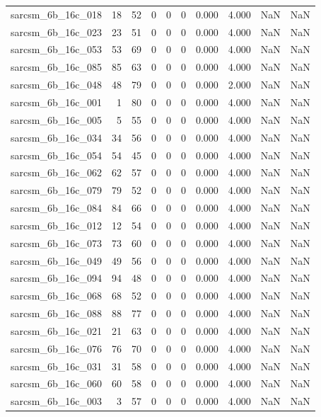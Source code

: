 \documentclass{article}
\begin{document}
\begin{longtable}{lrrrrrrrrr}
sarcsm\_6b\_16c\_018 & 18 & 52 & 0 & 0 & 0 & 0.000 & 4.000 & NaN & NaN \\
sarcsm\_6b\_16c\_023 & 23 & 51 & 0 & 0 & 0 & 0.000 & 4.000 & NaN & NaN \\
sarcsm\_6b\_16c\_053 & 53 & 69 & 0 & 0 & 0 & 0.000 & 4.000 & NaN & NaN \\
sarcsm\_6b\_16c\_085 & 85 & 63 & 0 & 0 & 0 & 0.000 & 4.000 & NaN & NaN \\
sarcsm\_6b\_16c\_048 & 48 & 79 & 0 & 0 & 0 & 0.000 & 2.000 & NaN & NaN \\
sarcsm\_6b\_16c\_001 & 1 & 80 & 0 & 0 & 0 & 0.000 & 4.000 & NaN & NaN \\
sarcsm\_6b\_16c\_005 & 5 & 55 & 0 & 0 & 0 & 0.000 & 4.000 & NaN & NaN \\
sarcsm\_6b\_16c\_034 & 34 & 56 & 0 & 0 & 0 & 0.000 & 4.000 & NaN & NaN \\
sarcsm\_6b\_16c\_054 & 54 & 45 & 0 & 0 & 0 & 0.000 & 4.000 & NaN & NaN \\
sarcsm\_6b\_16c\_062 & 62 & 57 & 0 & 0 & 0 & 0.000 & 4.000 & NaN & NaN \\
sarcsm\_6b\_16c\_079 & 79 & 52 & 0 & 0 & 0 & 0.000 & 4.000 & NaN & NaN \\
sarcsm\_6b\_16c\_084 & 84 & 66 & 0 & 0 & 0 & 0.000 & 4.000 & NaN & NaN \\
sarcsm\_6b\_16c\_012 & 12 & 54 & 0 & 0 & 0 & 0.000 & 4.000 & NaN & NaN \\
sarcsm\_6b\_16c\_073 & 73 & 60 & 0 & 0 & 0 & 0.000 & 4.000 & NaN & NaN \\
sarcsm\_6b\_16c\_049 & 49 & 56 & 0 & 0 & 0 & 0.000 & 4.000 & NaN & NaN \\
sarcsm\_6b\_16c\_094 & 94 & 48 & 0 & 0 & 0 & 0.000 & 4.000 & NaN & NaN \\
sarcsm\_6b\_16c\_068 & 68 & 52 & 0 & 0 & 0 & 0.000 & 4.000 & NaN & NaN \\
sarcsm\_6b\_16c\_088 & 88 & 77 & 0 & 0 & 0 & 0.000 & 4.000 & NaN & NaN \\
sarcsm\_6b\_16c\_021 & 21 & 63 & 0 & 0 & 0 & 0.000 & 4.000 & NaN & NaN \\
sarcsm\_6b\_16c\_076 & 76 & 70 & 0 & 0 & 0 & 0.000 & 4.000 & NaN & NaN \\
sarcsm\_6b\_16c\_031 & 31 & 58 & 0 & 0 & 0 & 0.000 & 4.000 & NaN & NaN \\
sarcsm\_6b\_16c\_060 & 60 & 58 & 0 & 0 & 0 & 0.000 & 4.000 & NaN & NaN \\
sarcsm\_6b\_16c\_003 & 3 & 57 & 0 & 0 & 0 & 0.000 & 4.000 & NaN & NaN \\

\end{longtable}
\end{document}
